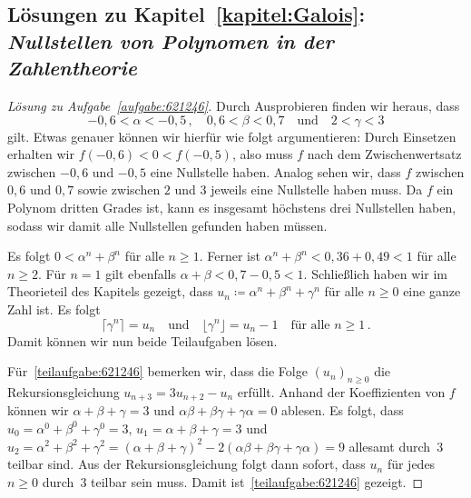 \subsection*{Lösungen zu Kapitel~\ref{kapitel:Galois}: \emph{Nullstellen von Polynomen in der Zahlentheorie}}

\begin{proof}[Lösung zu Aufgabe~\ref{aufgabe:621246}]
	Durch Ausprobieren finden wir heraus, dass
	\begin{equation*}
		-0{,}6<\alpha<-0{,}5\,,\quad 0{,}6<\beta<0{,}7\quad\text{und}\quad 2<\gamma <3
	\end{equation*}
	gilt. Etwas genauer können wir hierfür wie folgt argumentieren: Durch Einsetzen erhalten wir $f(-0{,}6)<0<f(-0{,}5)$, also muss $f$ nach dem Zwischenwertsatz zwischen $-0{,}6$ und $-0{,}5$ eine Nullstelle haben. Analog sehen wir, dass $f$ zwischen $0{,}6$ und $0{,}7$ sowie zwischen $2$ und $3$ jeweils eine Nullstelle haben muss. Da $f$ ein Polynom dritten Grades ist, kann es insgesamt höchstens drei Nullstellen haben, sodass wir damit alle Nullstellen gefunden haben müssen.
	
	Es folgt $0<\alpha^n+\beta^n$ für alle $n\geqslant 1$. Ferner ist $\alpha^n+\beta^n<0{,}36+0{,}49<1$ für alle $n\geqslant 2$. Für $n=1$ gilt ebenfalls $\alpha+\beta <0{,7} -0{,}5<1$. Schließlich haben wir im Theorieteil des Kapitels gezeigt, dass $u_n\coloneqq \alpha^n+\beta^n+\gamma^n$ für alle $n\geqslant 0$ eine ganze Zahl ist. Es folgt
	\begin{equation*}
		\lceil \gamma^n\rceil=u_n\quad\text{und}\quad\lfloor \gamma^n\rfloor =u_n-1\quad \text{für alle }n\geqslant 1\,.
	\end{equation*}
	Damit können wir nun beide Teilaufgaben lösen.
	
	Für~\ref{teilaufgabe:621246} bemerken wir, dass die Folge $(u_n)_{n\geqslant 0}$ die Rekursionsgleichung $u_{n+3}=3u_{n+2}-u_n$ erfüllt. Anhand der Koeffizienten von $f$ können wir $\alpha+\beta+\gamma=3$ und $\alpha\beta+\beta\gamma+\gamma\alpha=0$ ablesen. Es folgt, dass $u_0=\alpha^0+\beta^0+\gamma^0=3$, $u_1=\alpha+\beta+\gamma=3$ und $u_2=\alpha^2+\beta^2+\gamma^2=(\alpha+\beta+\gamma)^2-2(\alpha\beta+\beta\gamma+\gamma\alpha)=9$ allesamt durch~$3$ teilbar sind. Aus der Rekursionsgleichung folgt dann sofort, dass $u_n$ für jedes $n\geqslant 0$ durch~$3$ teilbar sein muss. Damit ist~\ref{teilaufgabe:621246} gezeigt.
	

\end{proof}
